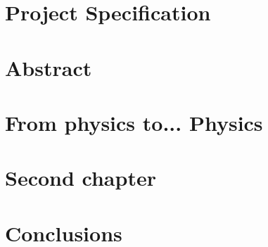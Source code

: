 \documentclass[a4paper,10pt,twoside]{report}
\author{\me}
\begin{document}




\normalsize

\newpage

\chapter*{\textcolor{OpenlabDarkBlue}{Project Specification} }\label{chapter:specification}


\chapter*{\textcolor{OpenlabDarkBlue}{Abstract}} \label{chapter:abstract}


\begingroup
\color{OpenlabDarkBlue}
\tableofcontents
\endgroup

\listoffigures

\listoftables

\lstlistoflistings


\clearpage

\setcounter{page}{10}
\chapter{From physics to... Physics}\label{chapter:first_chapter}


\chapter{Second chapter}\label{chapter:second_chapter}


\chapter{Conclusions}\label{chapter:conclusions}


%



\clearpage %
\appendix
{} %


\end{document}
